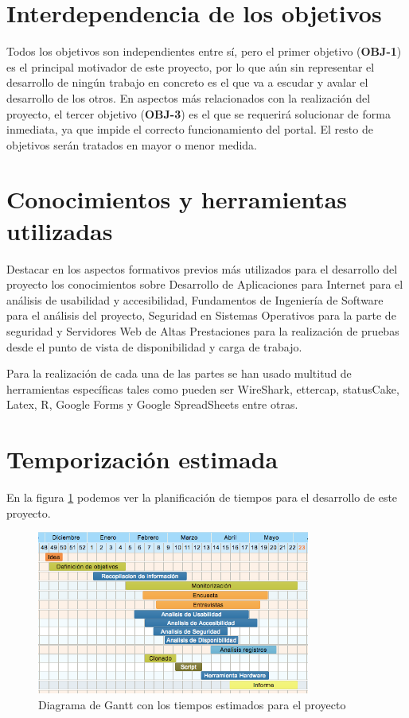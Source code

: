 \section{Interdependencia de los objetivos}

Todos los objetivos son independientes entre sí, pero el primer objetivo (\textbf{OBJ-1}) es el principal motivador de este proyecto, por lo que aún sin representar el desarrollo de ningún trabajo en concreto es el que va a escudar y avalar el desarrollo de los otros. En aspectos más relacionados con la realización del proyecto, el tercer objetivo (\textbf{OBJ-3}) es el que se requerirá solucionar de forma inmediata, ya que impide el correcto funcionamiento del portal. El resto de objetivos serán tratados en mayor o menor medida.

\section{Conocimientos y herramientas utilizadas}

\bigskip
Destacar en los aspectos formativos previos más utilizados para el desarrollo del proyecto los conocimientos sobre Desarrollo de Aplicaciones para Internet para el análisis de usabilidad y accesibilidad, Fundamentos de Ingeniería de Software para el análisis del proyecto, Seguridad en Sistemas Operativos para la parte de seguridad y Servidores Web de Altas Prestaciones para la realización de pruebas desde el punto de vista de disponibilidad y carga de trabajo.

Para la realización de cada una de las partes se han usado multitud de herramientas específicas tales como pueden ser WireShark, ettercap, statusCake, Latex, R, Google Forms y Google SpreadSheets entre otras. 


\section{Temporización estimada}


En la figura \ref{fig:temporizacion1} podemos ver la planificación de tiempos para el desarrollo de este proyecto. 

\begin{figure}[H]
\centering
\includegraphics[width=0.8\textwidth]{../screenshots/temporizacion1}
\caption{Diagrama de Gantt con los tiempos estimados para el proyecto}
\label{fig:temporizacion1}
\end{figure}







